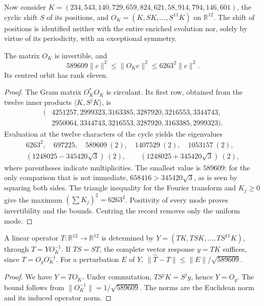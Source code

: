 Now consider \(K=(234,543,140,729,659,824,621,58,914,794,146,601)\),
the cyclic shift \(S\) of its positions, and
\(O_K=(K,SK,\ldots,S^{11}K)\) on \(\mathbb R^{12}\).
The shift of positions is identified neither with the entire enriched
evolution nor, solely by virtue of its periodicity, with an exceptional symmetry.

\begin{theorem}
\label{v:thm:acoplamiento-orbita}
The matrix \(O_K\) is invertible, and
\[
 589609\|c\|^2\leq\|O_Kc\|^2\leq6263^2\|c\|^2.
\]
Its centred orbit has rank eleven.
\end{theorem}
\begin{proof}
The Gram matrix \(O_K^*O_K\) is circulant. Its first row, obtained from
the twelve inner products \(\langle K,S^jK\rangle\), is
\[
 \begin{aligned}
 (&4251257,2999323,3163385,3287920,3216553,3344743,\\
  &2950064,3344743,3216553,3287920,3163385,2999323).
 \end{aligned}
\]
Evaluation at the twelve characters of the cycle yields the
eigenvalues
\[
 \begin{gathered}
 6263^2,\quad697225,\quad
 589609\ (2),\quad1407529\ (2),\quad1053157\ (2),\\
 (1248025-345420\sqrt3)\ (2),\qquad
 (1248025+345420\sqrt3)\ (2),
 \end{gathered}
\]
where parentheses indicate multiplicities. The smallest value is
\(589609\): for the only comparison that is not immediate,
\(658416>345420\sqrt3\), as is seen by squaring both sides.
The triangle inequality for the Fourier transform and \(K_j\geq0\)
give the maximum \((\sum K_j)^2=6263^2\).
Positivity of every mode proves invertibility and the bounds.
Centring the record removes only the uniform mode.
\end{proof}

\begin{corollary}
\label{v:cor:acoplamiento-identificacion}
A linear operator \(T:\mathbb R^{12}\to\mathbb R^{12}\) is determined by
\(Y=(TK,TSK,\ldots,TS^{11}K)\), through \(T=YO_K^{-1}\).
If \(TS=ST\), the complete vector response \(y=TK\) suffices, since
\(T=O_yO_K^{-1}\). For a perturbation \(E\) of \(Y\),
\(\|\widehat T-T\|\leq\|E\|/\sqrt{589609}\).
\end{corollary}
\begin{proof}
We have \(Y=TO_K\). Under commutation, \(TS^jK=S^jy\), hence \(Y=O_y\).
The bound follows from
\(\|O_K^{-1}\|=1/\sqrt{589609}\).
The norms are the Euclidean norm and its induced operator norm.
\end{proof}

